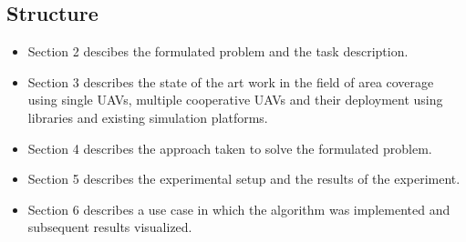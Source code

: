 \subsection{Structure}
\begin{itemize}
 \item Section 2 descibes the formulated problem and the task description.
 \item Section 3 describes the state of the art work in the field of area coverage using single
UAVs, multiple cooperative UAVs and their deployment using libraries and existing
simulation platforms.
 \item Section 4 describes the approach taken to solve the formulated problem.
 \item Section 5 describes the experimental setup and the results of the experiment.
 \item Section 6 describes a use case in which the algorithm was implemented and subsequent results visualized.
 \end{itemize}






